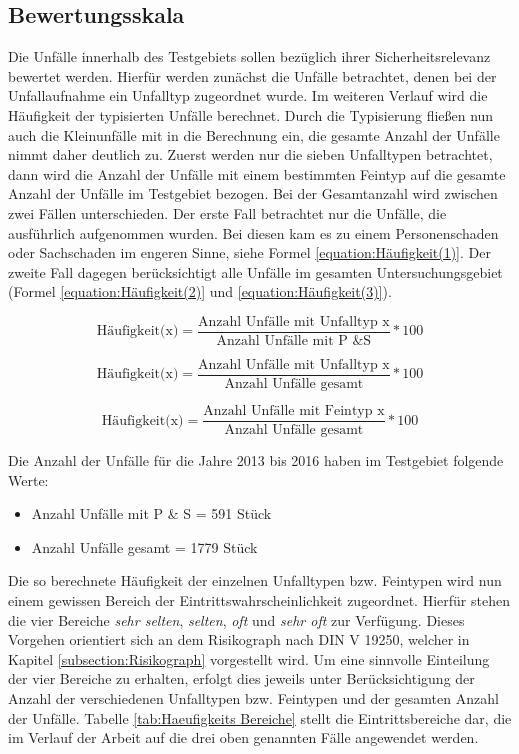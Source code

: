 \subsection{Bewertungsskala}\label{subsection:Bewertungsskala}
Die Unfälle innerhalb des Testgebiets sollen bezüglich ihrer Sicherheitsrelevanz bewertet werden. Hierfür werden zunächst die Unfälle betrachtet, denen bei der Unfallaufnahme ein Unfalltyp zugeordnet wurde. Im weiteren Verlauf wird die Häufigkeit der typisierten Unfälle berechnet. Durch die Typisierung fließen nun auch die Kleinunfälle mit in die Berechnung ein, die gesamte Anzahl der Unfälle nimmt daher deutlich zu. Zuerst werden nur die sieben Unfalltypen betrachtet, dann wird die Anzahl der Unfälle mit einem bestimmten Feintyp auf die gesamte Anzahl der Unfälle im Testgebiet bezogen. Bei der Gesamtanzahl wird zwischen zwei Fällen unterschieden. Der erste Fall betrachtet nur die Unfälle, die ausführlich aufgenommen wurden. Bei diesen kam es zu einem Personenschaden oder Sachschaden im engeren Sinne, siehe Formel \ref{equation:Häufigkeit(1)}. Der zweite Fall dagegen berücksichtigt alle Unfälle im gesamten Untersuchungsgebiet (Formel \ref{equation:Häufigkeit(2)} und \ref{equation:Häufigkeit(3)}).

\begin{equation}\label{equation:Häufigkeit(1)}
\text{Häufigkeit(x)} = \dfrac{\text{Anzahl Unfälle mit Unfalltyp x}}{\text{Anzahl Unfälle mit P \& S}}*100
\end{equation}

\begin{equation}\label{equation:Häufigkeit(2)}
\text{Häufigkeit(x)} = \dfrac{\text{Anzahl Unfälle mit Unfalltyp x}}{\text{Anzahl Unfälle gesamt}}*100
\end{equation}

\begin{equation}\label{equation:Häufigkeit(3)}
\text{Häufigkeit(x)} = \dfrac{\text{Anzahl Unfälle mit Feintyp x}}{\text{Anzahl Unfälle gesamt}}*100
\end{equation}

Die Anzahl der Unfälle für die Jahre 2013 bis 2016 haben im Testgebiet folgende Werte:

\begin{itemize}
	\item Anzahl Unfälle mit P \& S = 591 Stück
	\item Anzahl Unfälle gesamt = 1779 Stück
\end{itemize}

Die so berechnete Häufigkeit der einzelnen Unfalltypen bzw. Feintypen wird nun einem gewissen Bereich der Eintrittswahrscheinlichkeit zugeordnet. Hierfür stehen die vier Bereiche \textit{sehr selten}, \textit{selten}, \textit{oft} und \textit{sehr oft} zur Verfügung. Dieses Vorgehen orientiert sich an dem Risikograph nach DIN V 19250, welcher in Kapitel \ref{subsection:Risikograph} vorgestellt wird. Um eine sinnvolle Einteilung der  vier Bereiche zu erhalten, erfolgt dies jeweils unter Berücksichtigung der Anzahl der verschiedenen Unfalltypen bzw. Feintypen und der gesamten Anzahl der Unfälle. Tabelle \ref{tab:Haeufigkeits Bereiche} stellt die Eintrittsbereiche dar, die im Verlauf der Arbeit auf die drei oben genannten Fälle angewendet werden.

